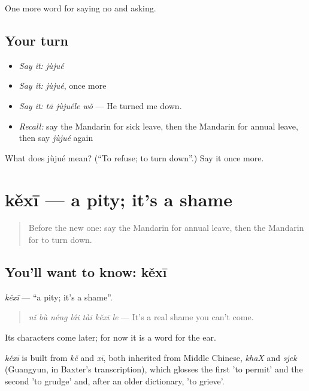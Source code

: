 \begin{grammarlens}[title={What you've built}]
One more word for saying no and asking.
\end{grammarlens}

\subsection*{Your turn}
\begin{itemize}
\raggedright
  \item \emph{Say it:} \emph{jùjué}
  \item \emph{Say it:} \emph{jùjué}, once more
  \item \emph{Say it:} \emph{tā jùjuéle wǒ} — He turned me down.
  \item \emph{Recall:} say the Mandarin for sick leave, then the Mandarin for annual leave, then say \emph{jùjué} again
\end{itemize}

\begin{tcolorbox}[breakable,colback=teal!4,colframe=teal!35!black,title={Before you move on}]
What does jùjué mean? (\textquotedblleft{}To refuse; to turn down\textquotedblright{}.) Say it once more.
\end{tcolorbox}
\section[kěxī]{kěxī — a pity; it's a shame}

\label{lesson:ZH-C264-kexi}



\begin{quote}
Before the new one: say the Mandarin for annual leave, then the Mandarin for to turn down.
\end{quote}

\subsection*{You'll want to know: kěxī}
\emph{kěxī} — \textquotedblleft{}a pity; it's a shame\textquotedblright{}.

\begin{quote}
\emph{nǐ bù néng lái tài kěxī le} — It's a real shame you can't come.
\end{quote}

Its characters come later; for now it is a word for the ear.

\begin{cousinweb}
\emph{kěxī} is built from \emph{kě} and \emph{xī}, both inherited from Middle Chinese, \emph{khaX} and \emph{sjek} (Guangyun, in Baxter's transcription), which glosses the first 'to permit' and the second 'to grudge' and, after an older dictionary, 'to grieve'.
\end{cousinweb}

